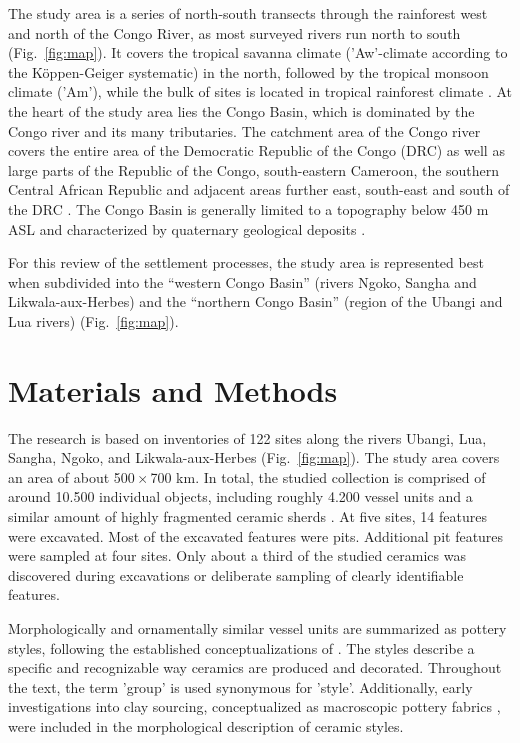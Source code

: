 \documentclass[smallextended,natbib]{svjour3}       %
\begin{document}
The study area is a series of north-south transects through the rainforest west and north of the Congo River, as most surveyed rivers run north to south (Fig.~\ref{fig:map}). It covers the tropical savanna climate ('Aw'-climate according to the Köppen-Geiger systematic) in the north, followed by the tropical monsoon climate ('Am'), while the bulk of sites is located in tropical rainforest climate \citep['Af';][]{Peel.2007}. At the heart of the study area lies the Congo Basin, which is dominated by the Congo river and its many tributaries. The catchment area of the Congo river covers the entire area of the Democratic Republic of the Congo (DRC) as well as large parts of the Republic of the Congo, south-eastern Cameroon, the southern Central African Republic and adjacent areas further east, south-east and south of the DRC \citep[60 Fig. 1]{Eggert.2017}. The Congo Basin is generally limited to a topography below 450 m ASL \citep[11]{Runge.2001} and characterized by quaternary geological deposits \citep{Persits.1997}.

For this review of the settlement processes, the study area is represented best when subdivided into the “western Congo Basin” (rivers Ngoko, Sangha and Likwala-aux-Herbes) and the “northern Congo Basin” (region of the Ubangi and Lua rivers) (Fig.~\ref{fig:map}).

\section*{Materials and Methods}\label{materials}

The research is based on inventories of 122 sites along the rivers Ubangi, Lua, Sangha, Ngoko, and Likwala-aux-Herbes (Fig.~\ref{fig:map}). The study area covers an area of about 500\,$\times$\,700 km. In total, the studied collection is comprised of around 10.500 individual objects, including roughly 4.200 vessel units and a similar amount of highly fragmented ceramic sherds \citep[23--43]{Seidensticker.2021e}. At five sites, 14 features were excavated. Most of the excavated features were pits. Additional pit features were sampled at four sites. Only about a third of the studied ceramics was discovered during excavations or deliberate sampling of clearly identifiable features.

Morphologically and ornamentally similar vessel units are summarized as pottery styles, following the established conceptualizations of \citet[52--57]{Wotzka.1995}. The styles describe a specific and recognizable way ceramics are produced and decorated. Throughout the text, the term 'group' is used synonymous for 'style'. Additionally, early investigations into clay sourcing, conceptualized as macroscopic pottery fabrics \citep[60--69]{Seidensticker.2021e}, were included in the morphological description of ceramic styles.
\end{document}
